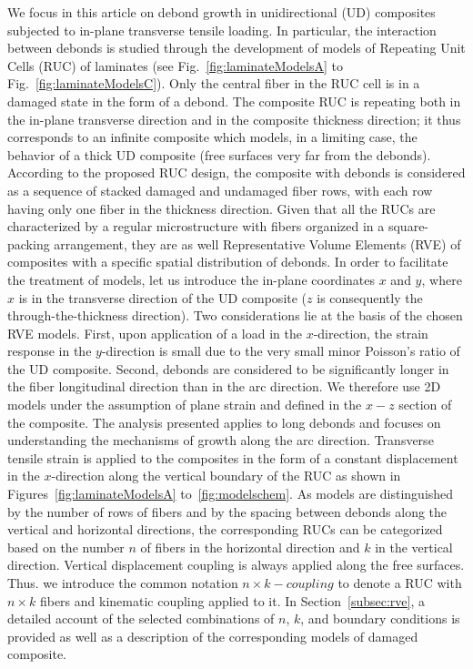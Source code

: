 \documentclass[smallextended]{svjour3}       %
\begin{document}
We focus in this article on debond growth in unidirectional (UD) composites subjected to in-plane transverse tensile loading. In particular, the interaction between debonds is studied through the development of models of Repeating Unit Cells (RUC) of laminates (see Fig.~\ref{fig:laminateModelsA} to Fig.~\ref{fig:laminateModelsC}). Only the central fiber in the RUC cell is in a damaged state in the form of a debond. The composite RUC is repeating both in the in-plane transverse direction and in the composite thickness direction; it thus corresponds to an infinite composite which models, in a limiting case, the behavior of a thick UD composite (free surfaces very far from the debonds). According to the proposed RUC design, the composite with debonds is considered as a sequence of stacked damaged and undamaged fiber rows, with each row having only one fiber in the thickness direction. Given that all the RUCs are characterized by a regular microstructure with fibers organized in a square-packing arrangement, they are as well Representative Volume Elements (RVE) of composites with a specific spatial distribution of debonds. In order to facilitate the treatment of models, let us introduce the in-plane coordinates $x$ and $y$, where $x$ is in the transverse direction of the UD composite ($z$ is consequently the through-the-thickness direction). Two considerations lie at the basis of the chosen RVE models. First, upon application of a load in the $x$-direction, the strain response in the $y$-direction is small due to the very small minor Poisson's ratio of the UD composite. Second, debonds are considered to be significantly longer in the fiber longitudinal direction than in the arc direction. We therefore use 2D models under the assumption of plane strain and defined in the $x-z$ section of the composite.  The analysis presented applies to long debonds and focuses on understanding the mechanisms of growth along the arc direction. Transverse tensile strain is applied to the composites in the form of a constant displacement in the $x$-direction along the vertical boundary of the RUC as shown in  Figures~\ref{fig:laminateModelsA} to~\ref{fig:modelschem}. As models are distinguished by the number of rows of fibers and by the spacing between debonds along the vertical and horizontal directions, the corresponding RUCs can be categorized based on the number $n$ of fibers in the horizontal direction and $k$ in the vertical direction. Vertical displacement coupling is always applied along the free surfaces. Thus. we introduce the common notation $n\times k-coupling$ to denote a RUC with $n\times k$ fibers and kinematic coupling applied to it. In Section~\ref{subsec:rve}, a detailed account of the selected combinations of $n$, $k$, and boundary conditions is provided as well as a description of the corresponding models of damaged composite.
\end{document}
